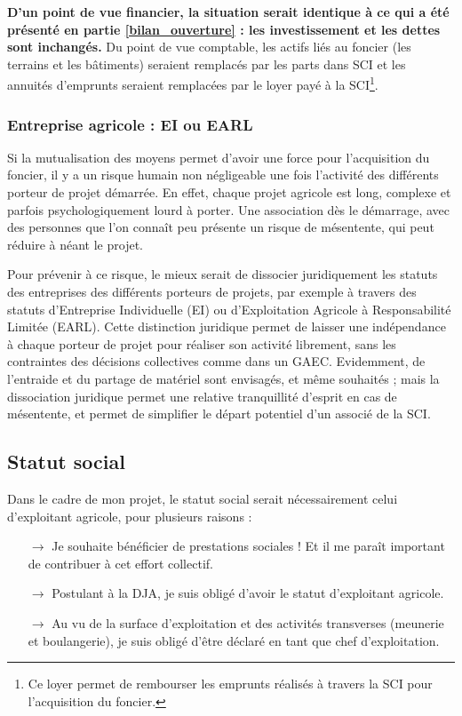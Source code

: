 \documentclass{book}
\begin{document}
\textbf{D'un point de vue financier, la situation serait identique à ce qui a été présenté en partie \ref{bilan_ouverture} : les investissement et les dettes sont inchangés.} Du point de vue comptable, les actifs liés au foncier (les terrains et les bâtiments) seraient remplacés par les parts dans SCI et les annuités d'emprunts seraient remplacées par le loyer payé à la SCI\footnote{Ce loyer permet de rembourser les emprunts réalisés à travers la SCI pour l'acquisition du foncier.}.

\subsubsection{Entreprise agricole : EI ou EARL}

Si la mutualisation des moyens permet d'avoir une force pour l'acquisition du foncier, il y a un risque humain non négligeable une fois l'activité des différents porteur de projet démarrée. En effet, chaque projet agricole est long, complexe et parfois psychologiquement lourd à porter. Une association dès le démarrage, avec des personnes que l'on connaît peu présente un risque de mésentente, qui peut réduire à néant le projet. 

Pour prévenir à ce risque, le mieux serait de dissocier juridiquement les statuts des entreprises des différents porteurs de projets, par exemple à travers des statuts d'Entreprise Individuelle (EI) ou d'Exploitation Agricole à Responsabilité Limitée (EARL). Cette distinction juridique permet de laisser une indépendance à chaque porteur de projet pour réaliser son activité librement, sans les contraintes des décisions collectives comme dans un GAEC. Evidemment, de l'entraide et du partage de matériel sont envisagés, et même souhaités ; mais la dissociation juridique permet une relative tranquillité d'esprit en cas de mésentente, et permet de simplifier le départ potentiel d'un associé de la SCI.

\subsection{Statut social}

Dans le cadre de mon projet, le statut social serait nécessairement celui d'exploitant agricole, pour plusieurs raisons : \
\begin{itemize}

	\item[$\rightarrow$] Je souhaite bénéficier de prestations sociales ! Et il me paraît important de contribuer à cet effort collectif.
	
	\item[$\rightarrow$] Postulant à la DJA, je suis obligé d'avoir le statut d'exploitant agricole.
	
	\item[$\rightarrow$] Au vu de la surface d'exploitation et des activités transverses (meunerie et boulangerie), je suis obligé d'être déclaré en tant que chef d'exploitation.

\end{itemize}
\end{document}
